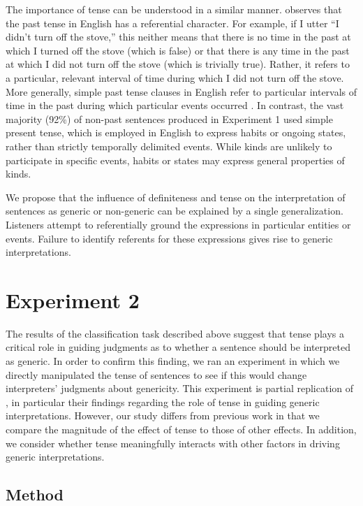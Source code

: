 \documentclass[10pt,letterpaper]{article}
\begin{document}
The importance of tense can be understood in a similar manner.  observes that the past tense in English has a referential character. For example, if I utter ``I didn't turn off the stove,'' this neither means that there is no time in the past at which I turned off the stove (which is false) or that there is any time in the past at which I did not turn off the stove (which is trivially true). Rather, it refers to a particular, relevant interval of time during which I did not turn off the stove. More generally, simple past tense clauses in English refer to particular intervals of time in the past during which particular events occurred \cite{Heim:1994}. In contrast, the vast majority (92\%) of non-past sentences produced in Experiment 1 used simple present tense, which is employed in English to express habits or ongoing states, rather than strictly temporally delimited events. While kinds are unlikely to participate in specific events, habits or states may express general properties of kinds.

We propose that the influence of definiteness and tense on the interpretation of sentences as generic or non-generic can be explained by a single generalization. Listeners attempt to referentially ground the expressions in particular entities or events. Failure to identify referents for these expressions gives rise to generic interpretations.

\section{Experiment 2}

The results of the classification task described above suggest that tense plays a critical role in guiding judgments as to whether a sentence should be interpreted as generic. In order to confirm this finding, we ran an experiment in which we directly manipulated the tense of sentences to see if this would change interpreters' judgments about genericity. This experiment is partial replication of , in particular their findings regarding the role of tense in guiding generic interpretations. However, our study differs from previous work in that we compare the magnitude of the effect of tense to those of other effects. In addition, we consider whether tense meaningfully interacts with other factors in driving generic interpretations.

\subsection{Method}
\end{document}
